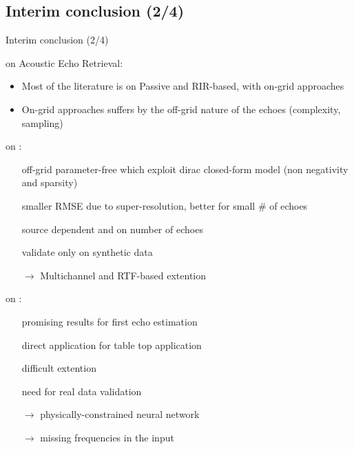 \subsection{Interim conclusion (2/4)}

\begin{frame}{Interim conclusion (2/4)}
    \begin{block}{on Acoustic Echo Retrieval:}
        \begin{itemize}
            \item Most of the literature is on Passive and RIR-based, with on-grid approaches
            \item On-grid approaches suffers by the off-grid nature of the echoes (complexity, sampling)
        \end{itemize}
    \end{block}

    \begin{block}{on \blaster:}
        \begin{itemize}
            \item[\cmark] off-grid parameter-free which exploit dirac closed-form model (non negativity and sparsity)
            \item[\cmark] smaller RMSE due to super-resolution, better for small \# of echoes
            \item[\xmark] source dependent and on number of echoes
            \item[\xmark] validate only on synthetic data
            \item[$\rightarrow$] Multichannel and RTF-based extention
        \end{itemize}
    \end{block}

    \begin{block}{on \lantern:}
        \begin{itemize}
            \item[\cmark] promising results for first echo estimation
            \item[\cmark] direct application for table top application
            \item[\xmark] difficult extention
            \item[\xmark] need for real data validation
            \item[$\rightarrow$] physically-constrained neural network
            \item[$\rightarrow$] missing frequencies in the input
        \end{itemize}
    \end{block}
\end{frame}